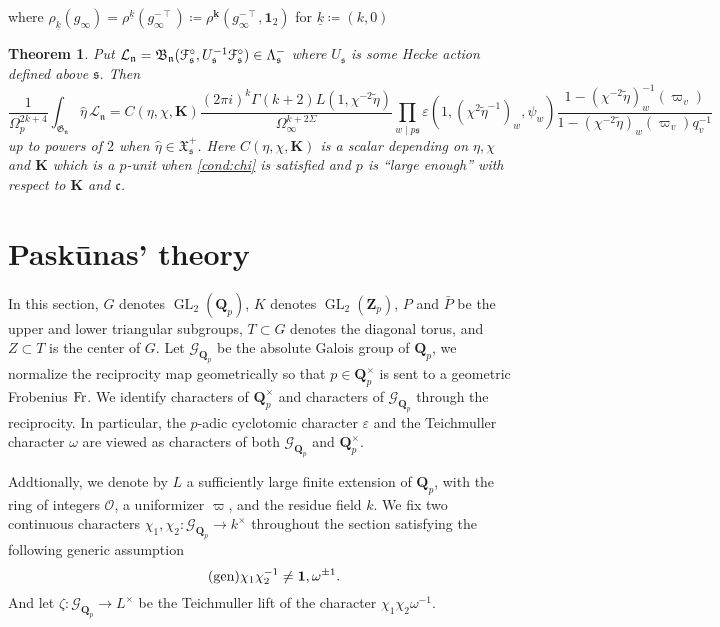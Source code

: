 \documentclass[leqno]{amsart}
\newcommand{\euF}{\EuScript{F}} %
\newcommand{\wt}[1]{\underline{ #1 }}
\newcommand{\bwt}[1]{\underline{\boldsymbol { #1 }}}
\newcommand{\fG}{\mathfrak{G}}
\newcommand{\fX}{\mathfrak{X}}
\newcommand{\B}{\mathfrak B}
\newcommand{\Gp}{\mathcal{G}_{\Qp}} %
\newcommand{\Fr}{\textnormal{Fr}} %
\DeclareMathOperator{\GL}{GL}
\newcommand{\id}{\mathbf{1}}
\newcommand{\Qp}{\mathbf{Q}_p}
\newcommand{\Zp}{\mathbf{Z}_p}
\newcommand{\K}{{\mathbf{K}}} %
\newcommand{\oo}{\mathcal{O}} %
\newcommand{\fc}{\mathfrak{c}}
\newcommand{\fs}{\mathfrak{s}}
\newcommand{\fn}{\mathfrak{n}}
\newtheorem{thm}{Theorem}[section]
\theoremstyle{definition}
\theoremstyle{remark}
\begin{document}
where $\rho_{\wt{k}}(g_\infty)=\rho^{\wt{k}}(g_\infty^{-\intercal})
\coloneqq \rho^{\bwt{k}}(g_\infty^{-\intercal},\id_2)$
for $\wt{k}\coloneqq (k,0)$



\begin{thm}\label{thm:intro2}
    Put $\mathcal{L}_\fn=\B_\fn(\euF^\circ_{\fs},U_\fs^{-1}\euF^\circ_{\fs})
    \in \Lambda_{\fs}^-$
    where $U_\fs$ is some Hecke action defined above $\fs$. Then
    \begin{equation*}
        \frac{1}{\Omega_p^{2k+4}}
        \int_{\fG_{\fn}}\hat{\eta}\,\mathcal{L}_\fn=
    C(\eta,\chi,\K)
    \frac{(2\pi i)^{k}\Gamma(k+2)L(1,\chi^{-2}\tilde{\eta})}{\Omega_\infty^{k+2\Sigma}}
    \prod_{w\mid p\fs}
    \varepsilon(1,(\chi^{2}\tilde{\eta}^{-1})_w,\psi_w)
    \frac{1-(\chi^{-2}\tilde{\eta})^{-1}_w(\varpi_v)}
    {1-(\chi^{-2}\tilde{\eta})_w(\varpi_v)q_v^{-1}}
    \end{equation*}
    up to powers of $2$
    when $\hat{\eta}\in \fX^+_{\fs}$.
    Here $C(\eta,\chi,\K)$ is a scalar depending on $\eta,\chi$ and $\K$
    which is a $p$-unit when \eqref{cond:chi} is satisfied 
    and $p$ is ``large enough''
    with respect to $\K$ and $\fc$. 
\end{thm}

\section{Pask\={u}nas' theory}

In this section,
$G$ denotes  $\GL_2(\Qp)$, 
$K$ denotes  $\GL_2(\Zp)$,  
$P$ and  $\bar{P}$ 
be the upper and lower triangular subgroups,
$T\subset G$ denotes the diagonal torus,
and  $Z\subset T$ is the center of  $G$.
Let  $\Gp$ be the absolute Galois group of  $\Qp$,
we normalize the reciprocity map  geometrically
so that  $p\in \Qp^\times$
is sent to a geometric Frobenius  $\Fr$.
We identify characters of  $\Qp^\times$
and characters of  $\Gp$ through the reciprocity.
In particular, 
the $p$-adic cyclotomic character $\varepsilon$ 
and the Teichmuller character $\omega$
are viewed as characters of both  $\Gp$ and  $\Qp^\times$.

Addtionally,
we denote by $L$ a sufficiently large 
finite extension of  $\Qp$,
with the ring of integers  $\oo$,
a uniformizer  $\varpi$,
and the residue field $k$.
We fix 
two continuous characters
$\chi_1,\chi_2\colon \Gp\to k^\times$ 
throughout the section satisfying
the following generic assumption
\begin{equation}\label{cond:generic}\tag{\text{gen}}
	\chi_1\chi_2^{-1}\neq \id,\omega^{\pm1}.
\end{equation}
And let $\zeta\colon \Gp\to L^\times$
be the Teichmuller lift of the character  $\chi_1\chi_2\omega^{-1}$.
\end{document}
